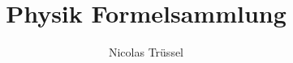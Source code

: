 \documentclass[10pt,a4paper,titlepage]{article}
\numberwithin{equation}{section}
\begin{document}
\title{Physik Formelsammlung}
\author{Nicolas Trüssel}












\end{document}
